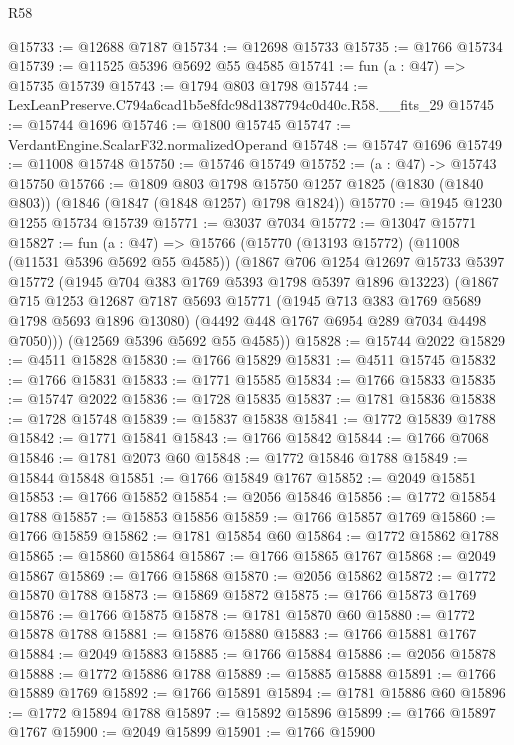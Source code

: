 \begin{lexlean}{R58}
\begin{coremodule}
@15733 := @12688 @7187
@15734 := @12698 @15733
@15735 := @1766 @15734
@15739 := @11525 @5396 @5692 @55 @4585
@15741 := fun (a : @47) => @15735 @15739
@15743 := @1794 @803 @1798
@15744 := LexLeanPreserve.C794a6cad1b5e8fdc98d1387794c0d40c.R58.__fits_29
@15745 := @15744 @1696
@15746 := @1800 @15745
@15747 := VerdantEngine.ScalarF32.normalizedOperand
@15748 := @15747 @1696
@15749 := @11008 @15748
@15750 := @15746 @15749
@15752 := (a : @47) -> @15743 @15750
@15766 := @1809
    @803
    @1798
    @15750
    @1257
    @1825
    (@1830 (@1840 @803))
    (@1846 (@1847 (@1848 @1257) @1798 @1824))
@15770 := @1945 @1230 @1255 @15734 @15739
@15771 := @3037 @7034
@15772 := @13047 @15771
@15827 := fun (a : @47) =>
  @15766
    (@15770
      (@13193 @15772)
      (@11008 (@11531 @5396 @5692 @55 @4585))
      (@1867
        @706
        @1254
        @12697
        @15733
        @5397
        @15772
        (@1945 @704 @383 @1769 @5393 @1798 @5397 @1896 @13223)
        (@1867
          @715
          @1253
          @12687
          @7187
          @5693
          @15771
          (@1945 @713 @383 @1769 @5689 @1798 @5693 @1896 @13080)
          (@4492 @448 @1767 @6954 @289 @7034 @4498 @7050)))
      (@12569 @5396 @5692 @55 @4585))
@15828 := @15744 @2022
@15829 := @4511 @15828
@15830 := @1766 @15829
@15831 := @4511 @15745
@15832 := @1766 @15831
@15833 := @1771 @15585
@15834 := @1766 @15833
@15835 := @15747 @2022
@15836 := @1728 @15835
@15837 := @1781 @15836
@15838 := @1728 @15748
@15839 := @15837 @15838
@15841 := @1772 @15839 @1788
@15842 := @1771 @15841
@15843 := @1766 @15842
@15844 := @1766 @7068
@15846 := @1781 @2073 @60
@15848 := @1772 @15846 @1788
@15849 := @15844 @15848
@15851 := @1766 @15849 @1767
@15852 := @2049 @15851
@15853 := @1766 @15852
@15854 := @2056 @15846
@15856 := @1772 @15854 @1788
@15857 := @15853 @15856
@15859 := @1766 @15857 @1769
@15860 := @1766 @15859
@15862 := @1781 @15854 @60
@15864 := @1772 @15862 @1788
@15865 := @15860 @15864
@15867 := @1766 @15865 @1767
@15868 := @2049 @15867
@15869 := @1766 @15868
@15870 := @2056 @15862
@15872 := @1772 @15870 @1788
@15873 := @15869 @15872
@15875 := @1766 @15873 @1769
@15876 := @1766 @15875
@15878 := @1781 @15870 @60
@15880 := @1772 @15878 @1788
@15881 := @15876 @15880
@15883 := @1766 @15881 @1767
@15884 := @2049 @15883
@15885 := @1766 @15884
@15886 := @2056 @15878
@15888 := @1772 @15886 @1788
@15889 := @15885 @15888
@15891 := @1766 @15889 @1769
@15892 := @1766 @15891
@15894 := @1781 @15886 @60
@15896 := @1772 @15894 @1788
@15897 := @15892 @15896
@15899 := @1766 @15897 @1767
@15900 := @2049 @15899
@15901 := @1766 @15900

\end{coremodule}
\end{lexlean}
